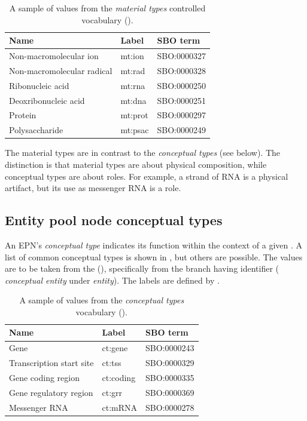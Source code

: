 \begin{table}[h]
  \centering
  \begin{tabular}{l>{\ttfamily}l>{\ttfamily}l}
    \toprule
    \textbf{Name}              & \textbf{\rmfamily Label} & \textbf{\rmfamily SBO term} \\
    \midrule
    Non-macromolecular ion     & mt:ion  & SBO:0000327\\
    Non-macromolecular radical & mt:rad  & SBO:0000328\\
    Ribonucleic acid           & mt:rna  & SBO:0000250\\
    Deoxribonucleic acid       & mt:dna  & SBO:0000251\\
    Protein                    & mt:prot & SBO:0000297\\
    Polysaccharide             & mt:psac & SBO:0000249\\
    \bottomrule
  \end{tabular}
  \caption{A sample of values from the \emph{material types} controlled
    vocabulary ().}
  \label{tab:material-types-cv}
\end{table}

The material types are in contrast to the \emph{conceptual types} (see below).  The distinction is that material types are about physical composition, while conceptual types are about roles.  For example, a strand of RNA is a physical artifact, but its use as messenger RNA is a role.


\subsection{Entity pool node conceptual types}
\label{sec:conceptual-types-cv}

An EPN's \emph{conceptual type} indicates its function within the context of a given \PD.  A list of common conceptual types is shown in , but others are possible.  The values are to be taken from the \sbo (\sbourl), specifically from the branch having identifier  ($\!$\emph{conceptual entity} under \emph{entity}).  The labels are defined by \SBGNPDLone.

\begin{table}[h]
  \centering
  \begin{tabular}{l>{\ttfamily}l>{\ttfamily}l}
    \toprule
    \textbf{Name}              & \textbf{\rmfamily Label} & \textbf{\rmfamily SBO term} \\
    \midrule
    Gene                      & ct:gene   & SBO:0000243\\
    Transcription start site  & ct:tss    & SBO:0000329\\
    Gene coding region        & ct:coding & SBO:0000335\\
    Gene regulatory region    & ct:grr    & SBO:0000369\\
    Messenger RNA             & ct:mRNA   & SBO:0000278\\
    \bottomrule
  \end{tabular}
  \caption{A sample of values from the \emph{conceptual types} vocabulary
    ().}
  \label{tab:conceptual-types-cv}
\end{table}


